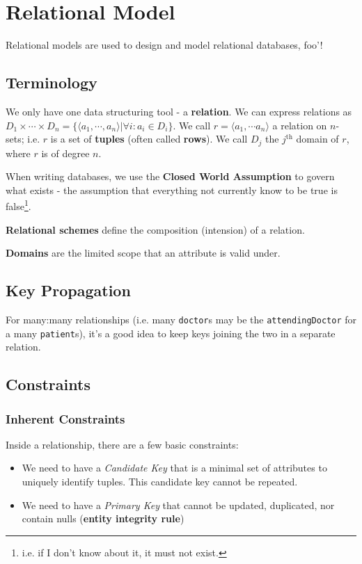         \chapter{Relational Model} %
        \label{cha:relational_model}
            Relational models are used to design and model relational databases, foo'!

            \section{Terminology} %
            \label{sec:terminology}
                We only have one data structuring tool - a \textbf{relation}.
                We can express relations as $D_1 \times \cdots \times D_n = \{ \langle a_1, \cdots, a_n \rangle | \forall i: a_i \in D_i\}$.
                We call $r = \langle a_1, \cdots a_n\rangle$ a relation on $n$-sets;
                i.e. $r$ is a set of \textbf{tuples} (often called \textbf{rows}).
                We call $D_j$ the $j^{\text{th}}$ domain of $r$, where $r$ is of degree $n$.

                When writing databases, we use the \textbf{Closed World Assumption} to govern what exists - the assumption that everything not currently know to be true is false\footnote{i.e. if I don't know about it, it must not exist.}.

                \textbf{Relational schemes} define the composition (intension) of a relation.

                \textbf{Domains} are the limited scope that an attribute is valid under.
            \section{Key Propagation} %
            \label{sec:key_propogation}
                For many:many relationships (i.e. many \verb|doctor|s may be the \verb|attendingDoctor| for a many \verb|patient|s), it's a good idea to keep keys joining the two in a separate relation.
            \section{Constraints} %
            \label{sec:constraints}
                \subsection{Inherent Constraints} %
                \label{sub:inherent_constraints}
                    Inside a relationship, there are a few basic constraints:
                    \begin{itemize}
                        \item We need to have a \textit{Candidate Key} that is a minimal set of attributes to uniquely identify tuples.
                        This candidate key cannot be repeated.
					\item We need to have a \textit{Primary Key} that cannot be updated, duplicated,
						nor contain nulls (\textbf{entity integrity rule})
                    \end{itemize}
